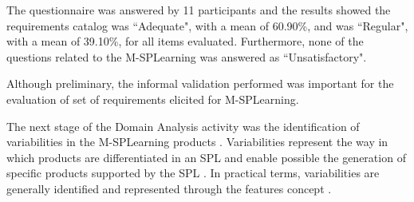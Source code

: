The questionnaire was answered by 11 participants and the results showed the requirements catalog was ``Adequate", with a mean of 60.90\%, and was ``Regular", with a mean of 39.10\%, for all items evaluated. Furthermore, none of the questions related to the M-SPLearning was answered as ``Unsatisfactory". 

%

Although preliminary, the informal validation performed was important for the evaluation of set of requirements elicited for M-SPLearning.

The next stage of the Domain Analysis activity was the identification of variabilities in the M-SPLearning products \cite{krueger02}. Variabilities represent the way in which products are differentiated in an SPL and enable possible the generation of specific products supported by the SPL \cite{vangurp01}. In practical terms, variabilities are generally identified and represented through the features concept \cite{bosch01,kang90}.

